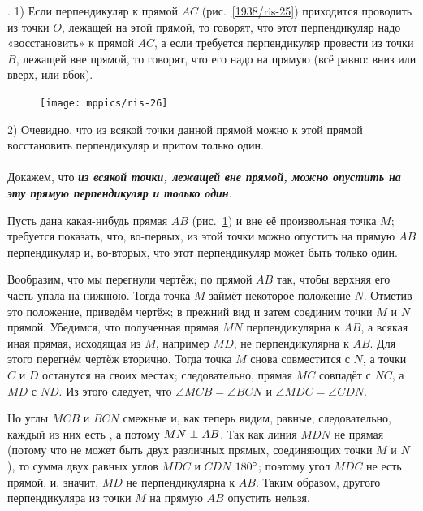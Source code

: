 \documentclass[oneside]{book}
\begin{document}
\smallskip

\mbox{.}
1) Если перпендикуляр к прямой $AC$ (рис.~\ref{1938/ris-25}) приходится проводить из точки $O$, лежащей на этой прямой, то говорят, что этот перпендикуляр надо «восстановить» к прямой $AC$, а если требуется перпендикуляр провести из точки $B$, лежащей вне прямой, то говорят, что его надо  на прямую (всё равно:
вниз или вверх, или вбок).

\begin{figure}
\centering
\texttt{[image: mppics/ris-26]}
\caption{}\label{1938/ris-26}
\end{figure}

2) Очевидно, что из всякой точки данной прямой можно к этой прямой восстановить перпендикуляр и притом только один.

\paragraph{}\label{1938/24}
Докажем, что \textbf{\emph{из всякой точки, лежащей вне прямой, можно опустить на эту прямую перпендикуляр и только один}}.

Пусть дана какая-нибудь прямая $AB$ (рис.~\ref{1938/ris-26}) и вне её произвольная точка $M$;
требуется показать, что, во-первых, из этой точки можно опустить на прямую $AB$ перпендикуляр и, во-вторых, что этот перпендикуляр может быть только один.

Вообразим, что мы перегнули чертёж;
по прямой $AB$ так, чтобы верхняя его часть упала на нижнюю.
Тогда точка $M$ займёт некоторое положение $N$.
Отметив это положение, приведём чертёж;
в прежний вид и затем соединим точки $M$ и $N$ прямой.
Убедимся, что полученная прямая $MN$ перпендикулярна к $AB$, а всякая иная прямая, исходящая из $M$, например $MD$, не перпендикулярна к $AB$.
Для этого перегнём чертёж вторично.
Тогда точка $M$ снова совместится с $N$, а точки $C$ и $D$ останутся на своих местах;
следовательно, прямая $MC$ совпадёт с $NC$, а $MD$ с $ND$.
Из этого следует, что $\angle MCB = \angle BCN$ и $\angle MDC = \angle CDN$.

Но углы $MCB$ и $BCN$ смежные и, как теперь видим, равные;
следовательно, каждый из них есть , а потому $MN\z\perp AB$.
Так как линия $MDN$ не прямая (потому что не может быть двух различных прямых, соединяющих точки $M$ и $N$), то сумма двух равных углов $MDC$ и $CDN$  $180\degree$;
поэтому угол $MDC$ не есть прямой, и, значит, $MD$ не перпендикулярна к $AB$.
Таким образом, другого перпендикуляра из точки $M$ на прямую $AB$ опустить нельзя.
\end{document}
